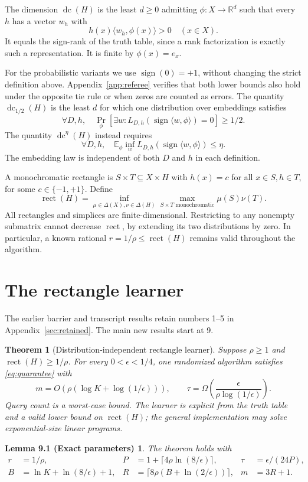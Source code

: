 \documentclass[11pt]{article}
\newtheorem{theorem}{Theorem}
\DeclareMathOperator{\dc}{dc}
\DeclareMathOperator{\sign}{sign}
\DeclareMathOperator{\rect}{rect}
\newcommand{\R}{\mathbb R}
\newcommand{\E}{\mathbb E}
\newcommand{\1}{\mathbf 1}
\newtheorem*{parameterlemma}{Lemma 9.1 (Exact parameters)}
\begin{document}
The dimension $\dc(H)$ is the least $d\ge0$ admitting $\phi:X\to\R^d$ such that every $h$ has a vector $w_h$ with
\begin{equation}\label{eq:strict}
 h(x)\langle w_h,\phi(x)\rangle>0\quad(x\in X).
\end{equation}
It equals the sign-rank of the truth table, since a rank factorization is exactly such a representation. It is finite by $\phi(x)=e_x$.

For the probabilistic variants we use $\sign(0)=+1$, without changing the strict definition above. Appendix~\ref{app:referee} verifies that both lower bounds also hold under the opposite tie rule or when zeros are counted as errors. The quantity $\dc_{1/2}(H)$ is the least $d$ for which one distribution over embeddings satisfies
\[
 \forall D,h,\quad \Pr_\phi[\exists w:L_{D,h}(\sign\langle w,\phi\rangle)=0]\ge1/2.
\]
The quantity $\dc^\eta(H)$ instead requires
\[
 \forall D,h,\quad \E_\phi\inf_w L_{D,h}(\sign\langle w,\phi\rangle)\le\eta.
\]
The embedding law is independent of both $D$ and $h$ in each definition.

A monochromatic rectangle is $S\times T\subseteq X\times H$ with $h(x)=c$ for all $x\in S,h\in T$, for some $c\in\{-1,+1\}$. Define
\[
 \rect(H)=\inf_{\mu\in\Delta(X),\nu\in\Delta(H)}
       \max_{S\times T\text{ monochromatic}}\mu(S)\nu(T).
\]
All rectangles and simplices are finite-dimensional. Restricting to any nonempty submatrix cannot decrease $\rect$, by extending its two distributions by zero. In particular, a known rational $r=1/\rho\le\rect(H)$ remains valid throughout the algorithm.

\section{The rectangle learner}
The earlier barrier and transcript results retain numbers 1--5 in Appendix~\ref{sec:retained}. The main new results start at 9.
\setcounter{theorem}{8}
\begin{theorem}[Distribution-independent rectangle learner]\label{thm:main}
Suppose $\rho\ge1$ and $\rect(H)\ge1/\rho$. For every $0<\epsilon<1/4$, one randomized algorithm satisfies \eqref{eq:guarantee} with
\[
 m=O\!\left(\rho(\log K+\log(1/\epsilon))\right),\qquad
 \tau=\Omega\!\left(\frac{\epsilon}{\rho\log(1/\epsilon)}\right).
\]
Query count is a worst-case bound. The learner is explicit from the truth table and a valid lower bound on $\rect(H)$; the general implementation may solve exponential-size linear programs.
\end{theorem}
\begin{parameterlemma}
The theorem holds with
\begin{align}
 r&=1/\rho,&P&=1+\lceil4\rho\ln(8/\epsilon)\rceil,&\tau&=\epsilon/(24P),\label{eq:params1}\\
 B&=\ln K+\ln(8/\epsilon)+1,&R&=\lceil8\rho(B+\ln(2/\epsilon))\rceil,&m&=3R+1.\label{eq:params2}
\end{align}
\end{parameterlemma}
\end{document}
